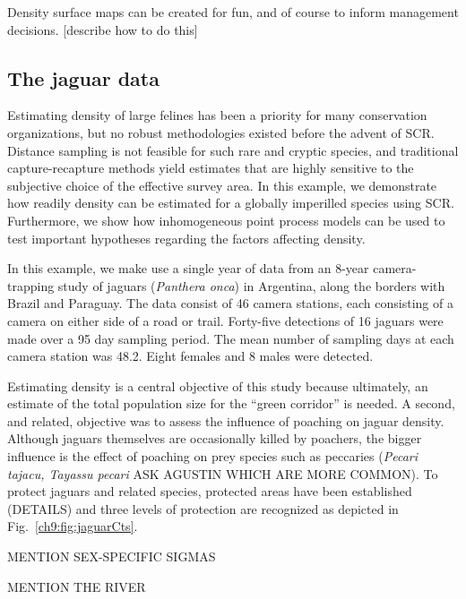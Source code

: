 Density surface maps can be created for fun, and of course to inform
management decisions. [describe how to do this]


\subsection{The jaguar data}

Estimating density of large felines has been a priority for many
conservation organizations, but no robust methodologies existed before
the advent of SCR. Distance sampling is not feasible for such rare and
cryptic species, and traditional capture-recapture methods yield
estimates that are highly sensitive to the subjective choice of the
effective survey area. In this example, we
demonstrate how readily density can be estimated for a
globally imperilled species using SCR. Furthermore, we show how
inhomogeneous point process models can be used to test important
hypotheses regarding the factors affecting density.

In this example, we make use a single year of data from an 8-year
camera-trapping study of jaguars (\emph{Panthera onca}) in Argentina,
along the borders with Brazil and Paraguay. The data consist of 46
camera stations, each consisting of a camera on either side of a
road or trail. Forty-five detections of 16 jaguars were made over a 95
day sampling period. The mean number of sampling days at each camera
station was 48.2. Eight females and 8 males were detected.

Estimating density is a central objective of this study because
ultimately, an estimate of the total population size for the ``green
corridor'' is needed. A second, and related, objective was to assess
the influence of poaching on jaguar density. Although jaguars
themselves are occasionally killed by poachers, the bigger influence
is the effect of poaching on prey species such as peccaries
(\emph{Pecari tajacu, Tayassu pecari} ASK AGUSTIN WHICH ARE MORE
COMMON). To protect jaguars and related species, protected areas have
been established (DETAILS) and three levels of protection are
recognized as depicted in Fig.~\ref{ch9:fig:jaguarCts}.

MENTION SEX-SPECIFIC SIGMAS

MENTION THE RIVER

